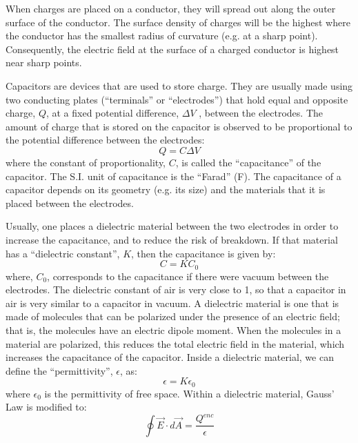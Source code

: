 When charges are placed on a conductor, they will spread out along the outer surface of the conductor. The surface density of charges will be the highest where the conductor has the smallest radius of curvature (e.g. at a sharp point). Consequently, the electric field at the surface of a charged conductor is highest near sharp points.

Capacitors are devices that are used to store charge. They are usually made using two conducting plates (``terminals'' or ``electrodes'') that hold equal and opposite charge, $Q$, at a fixed potential difference, $\Delta V$ , between the electrodes. The amount of charge that is stored on the capacitor is observed to be proportional to the potential difference between the electrodes:
\begin{equation}
Q=C\Delta V
\end{equation}
where the constant of proportionality, $C$, is called the ``capacitance'' of the capacitor. The S.I. unit of capacitance is the ``Farad'' (F). The capacitance of a capacitor depends on its geometry (e.g. its size) and the materials that it is placed between the electrodes.

Usually, one places a dielectric material between the two electrodes in order to increase the capacitance, and to reduce the risk of breakdown. If that material has a ``dielectric constant'', $K$, then the capacitance is given by:
\begin{equation}
C=KC_0
\end{equation}
where, $C_0$, corresponds to the capacitance if there were vacuum between the electrodes. The dielectric constant of air is very close to 1, so that a capacitor in air is very similar to a capacitor in vacuum. A dielectric material is one that is made of molecules that can be polarized under the presence of an electric field; that is, the molecules have an electric dipole moment. When the molecules in a material are polarized, this reduces the total electric field in the material, which increases the capacitance of the capacitor. Inside a dielectric material, we can define the ``permittivity'', $\epsilon$, as:
\begin{equation}
\epsilon=K\epsilon_0
\end{equation}
where $\epsilon_0$ is the permittivity of free space. Within a dielectric material, Gauss' Law is modified to:
\begin{equation}
\oint \vec E \cdot d\vec A=\frac{Q^{enc}}{\epsilon}
\end{equation}

